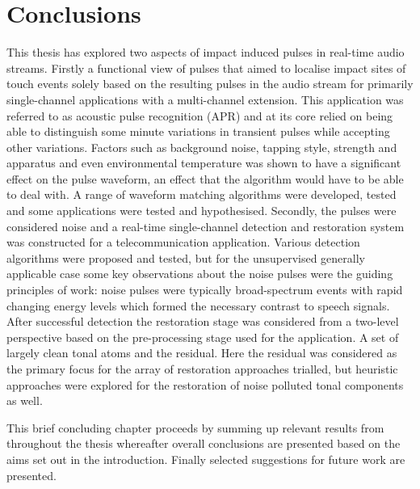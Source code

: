 \def\baselinestretch{1}
\chapter{Conclusions}\label{ch:Conclusions}
\ifpdf
    \graphicspath{{Conclusions/ConclusionsFigs/PNG/}{Conclusions/ConclusionsFigs/PDF/}{Conclusions/ConclusionsFigs/}}
\else
    \graphicspath{{Conclusions/ConclusionsFigs/EPS/}{Conclusions/ConclusionsFigs/}}
\fi

\def\baselinestretch{1.6}


This thesis has explored two aspects of impact induced pulses in real-time audio streams. Firstly a functional view of pulses that aimed to localise impact sites of touch events solely based on the resulting pulses in the audio stream for primarily single-channel applications with a multi-channel extension. This application was referred to as acoustic pulse recognition (APR) and at its core relied on being able to distinguish some minute variations in transient pulses while accepting other variations. Factors such as background noise, tapping style, strength and apparatus and even environmental temperature was shown to have a significant effect on the pulse waveform, an effect that the algorithm would have to be able to deal with. A range of waveform matching algorithms were developed, tested and some applications were tested and hypothesised.
Secondly, the pulses were considered noise and a real-time single-channel detection and restoration system was constructed for a telecommunication application. Various detection algorithms were proposed and tested, but for the unsupervised generally applicable case some key observations about the noise pulses were the guiding principles of work: noise pulses were typically broad-spectrum events with rapid changing energy levels which formed the necessary contrast to speech signals. After successful detection the restoration stage was considered from a two-level perspective based on the pre-processing stage used for the application. A set of largely clean tonal atoms and the residual. Here the residual was considered as the primary focus for the array of restoration approaches trialled, but heuristic approaches were explored for the restoration of noise polluted tonal components as well.

This brief concluding chapter proceeds by summing up relevant results from throughout the thesis whereafter overall conclusions are presented based on the aims set out in the introduction. Finally selected suggestions for future work are presented.

